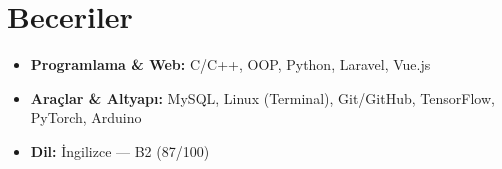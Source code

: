 \section{Beceriler}

\begin{itemize}[leftmargin=1.5em, itemsep=2pt, topsep=2pt]
  \item \textbf{Programlama \& Web:} C/C++, OOP, Python, Laravel, Vue.js
  \item \textbf{Araçlar \& Altyapı:} MySQL, Linux (Terminal), Git/GitHub, TensorFlow, PyTorch, Arduino
  \item \textbf{Dil:} İngilizce — B2 (87/100)
\end{itemize}
